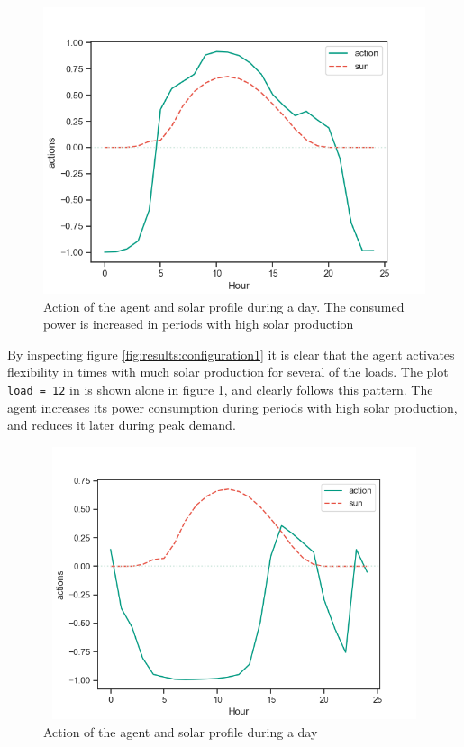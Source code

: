 \documentclass[class=book, crop=false]{standalone}
\begin{document}
\begin{figure}[h]
    \center
\includegraphics[scale=0.7]{figures/configuration1_follows_sun.png}
    \caption[size = 9]{Action of the agent and solar profile during a day. The consumed power is increased in periods with high solar production}
    \label{fig:results:configuration1_follows_sun}
\end{figure}

By inspecting figure \ref{fig:results:configuration1} it is clear that the agent activates flexibility in times with much solar production for several of the loads. The plot \texttt{load = 12} in is shown alone in figure \ref{fig:results:configuration1_follows_sun}, and clearly follows this pattern. The agent increases its power consumption during periods with high solar production, and reduces it later during peak demand.


\begin{figure}[h]
    \center
\includegraphics[height=8cm, width=12cm]{figures/configuration1_negative_actions.png}
    \caption[size = 9]{Action of the agent and solar profile during a day}
    \label{fig:results:configuration1_negative_actions}
\end{figure}
\end{document}
